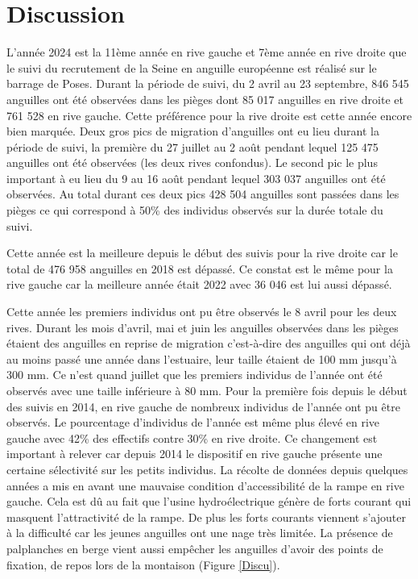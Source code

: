 \documentclass[11pt,titlepage,twoside]{article}\usepackage[]{graphicx}\usepackage[table]{xcolor}
\begin{document}
\section{Discussion}

L’année 2024 est la 11ème année en rive gauche et 7ème année en rive droite que le suivi du recrutement de la Seine en anguille européenne est réalisé sur le barrage de Poses. Durant la période de suivi, du 2 avril au 23 septembre, 846 545 anguilles ont été observées dans les pièges dont 85 017 anguilles en rive droite et 761 528 en rive gauche. Cette préférence pour la rive droite est cette année encore bien marquée. Deux gros pics de migration d’anguilles ont eu lieu durant la période de suivi, la première du 27 juillet au 2 août pendant lequel 125 475 anguilles ont été observées (les deux rives confondus). Le second pic le plus important à eu lieu du 9 au 16 août pendant lequel 303 037 anguilles ont été observées. Au total durant ces deux pics 428 504 anguilles sont passées dans les pièges ce qui correspond à 50\% des individus observés sur la durée totale du suivi. 

\vspace{0.5cm}
Cette année est la meilleure depuis le début des suivis pour la rive droite car le total de 476 958 anguilles en 2018 est dépassé. Ce constat est le même pour la rive gauche car la meilleure année était 2022 avec 36 046 est lui aussi dépassé. 

\vspace{0.5cm}
Cette année les premiers individus ont pu être observés le 8 avril pour les deux rives. Durant les mois d’avril, mai et juin les anguilles observées dans les pièges étaient des anguilles en reprise de migration c’est-à-dire des anguilles qui ont déjà au moins passé une année dans l’estuaire, leur taille étaient de 100 mm jusqu’à 300 mm. Ce n’est quand juillet que les premiers individus de l’année ont été observés avec une taille inférieure à 80 mm. Pour la première fois depuis le début des suivis en 2014, en rive gauche de nombreux individus de l’année ont pu être observés. Le pourcentage d’individus de l’année est même plus élevé en rive gauche avec 42\% des effectifs contre 30\% en rive droite. Ce changement est important à relever car depuis 2014 le dispositif en rive gauche présente une certaine sélectivité sur les petits individus. La récolte de données depuis quelques années a mis en avant une mauvaise condition d’accessibilité de la rampe en rive gauche. Cela est dû au fait que l’usine hydroélectrique génère de forts courant qui masquent l’attractivité de la rampe. De plus les forts courants viennent s’ajouter à la difficulté car les jeunes anguilles ont une nage très limitée. La présence de palplanches en berge vient aussi empêcher les anguilles d’avoir des points de fixation, de repos lors de la montaison (Figure \ref{Discu}). 
\end{document}
